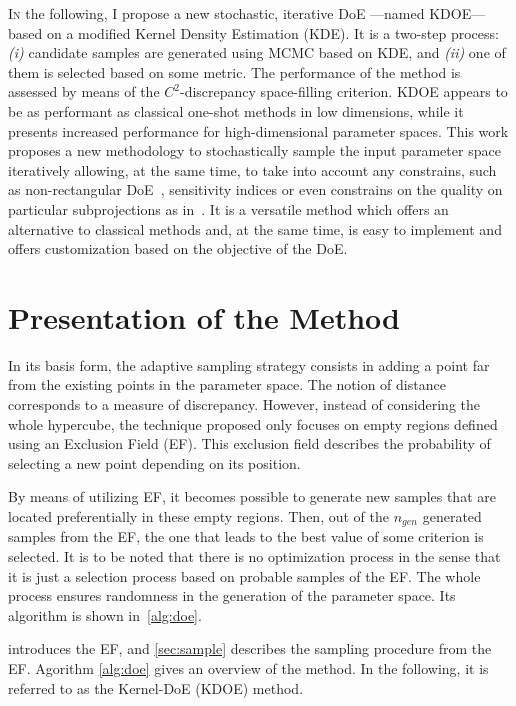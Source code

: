 \lettrine{I}{n} the following, I propose a new stochastic, iterative DoE ---\thinspace named KDOE\thinspace--- based on a modified Kernel Density Estimation (KDE). It is a two-step process: \emph{(i)} candidate samples are generated using MCMC based on KDE, and \emph{(ii)} one of them is selected based on some metric. The performance of the method is assessed by means of the $C^2$-discrepancy space-filling criterion. KDOE appears to be as performant as classical one-shot methods in low dimensions, while it presents increased performance for high-dimensional parameter spaces. This work proposes a new  methodology to stochastically sample the input parameter space iteratively allowing, at the same time, to take into account any constrains, such as non-rectangular DoE~\citep{Lekivetz2015}, sensitivity indices or even constrains on the quality on particular subprojections as in~\citep{Joseph2015}. It is a versatile method which offers an alternative to classical methods and, at the same time, is easy to implement and offers customization based on the objective of the DoE.

\section{Presentation of the Method}\label{sec:method}

In its basis form, the adaptive sampling strategy consists in adding a point far from the existing points in the parameter space. The notion of distance corresponds to a measure of discrepancy. However, instead of considering the whole hypercube, the technique proposed only focuses on empty regions defined using an Exclusion Field (EF). This exclusion field describes the probability of selecting a new point depending on its position.

By means of utilizing EF, it becomes possible to generate new samples that are located preferentially in these empty regions. Then, out of the $n_{gen}$ generated samples from the EF, the one that leads to the best value of some criterion is selected. It is to be noted that there is no optimization process in the sense that it is just a selection process based on probable samples of the EF. The whole process ensures randomness in the generation of the parameter space. Its algorithm is shown in~\cref{alg:doe}. %

 introduces the EF, and \cref{sec:sample} describes the sampling procedure from the EF. Agorithm \ref{alg:doe} gives an overview of the method. In the following, it is referred to as the Kernel-DoE (KDOE) method. 

